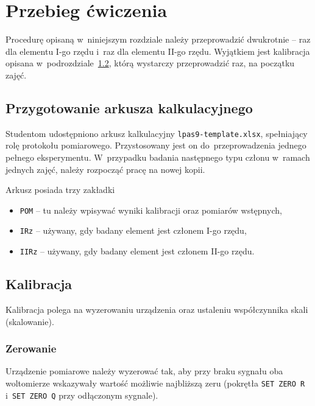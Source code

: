 \documentclass[paper=a4,DIV=12]{lpas}
\begin{document}
\section{Przebieg ćwiczenia}
\label{sec:0CM1S}

Procedurę opisaną w~niniejszym rozdziale należy przeprowadzić dwukrotnie -- raz
dla elementu I-go rzędu i~raz dla elementu II-go rzędu. Wyjątkiem jest
kalibracja opisana w~podrozdziale~\ref{sec:VDTSB}, którą wystarczy
przeprowadzić raz, na początku zajęć.

\subsection{Przygotowanie arkusza kalkulacyjnego}
\label{sec:S5JXT}

Studentom udostępniono arkusz kalkulacyjny \texttt{lpas9-template.xlsx},
spełniający rolę protokołu po\-mia\-ro\-we\-go. Przystosowany jest on
do~przeprowadzenia jednego pełnego eksperymentu. W~przypadku badania następnego
typu członu w~ramach jednych zajęć, należy rozpocząć pracę na nowej kopii.

Arkusz posiada trzy zakładki
\begin{itemize}
  \item \texttt{POM} -- tu należy wpisywać wyniki kalibracji oraz pomiarów
    wstępnych,
  \item \texttt{IRz} -- używany, gdy badany element jest członem I-go rzędu,
  \item \texttt{IIRz} -- używany, gdy badany element jest członem II-go rzędu.
\end{itemize}

\subsection{Kalibracja}
\label{sec:VDTSB}

Kalibracja polega na wyzerowaniu urządzenia oraz ustaleniu współczynnika skali
(skalowanie).

\subsubsection{Zerowanie}
\label{sec:6OYTI}

Urządzenie pomiarowe należy wyzerować tak, aby przy braku sygnału oba
woltomierze wskazywały wartość możliwie najbliższą zeru (pokrętła \texttt{SET
ZERO R} i~\texttt{SET ZERO Q} przy odłączonym sygnale).
\end{document}

